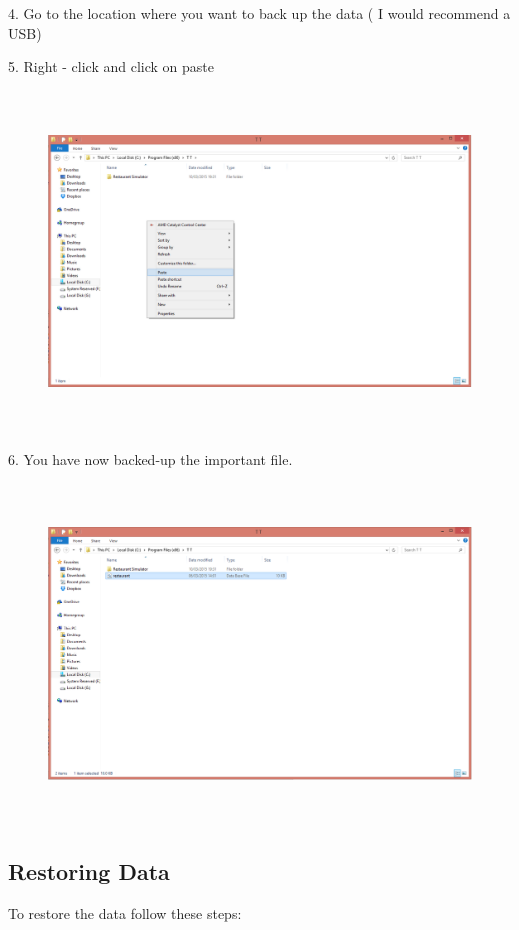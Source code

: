 4. Go to the location where you want to back up the data ( I would recommend a USB)

5. Right - click and click on paste

\begin{figure}[H]
    \includegraphics[height = 9cm]{./Manual/images/backup2} 
    \caption{} \label{fig:t}
\end{figure}

6. You have now backed-up the important file.
\begin{figure}[H]
    \includegraphics[height = 9cm]{./Manual/images/backup3} 
    \caption{} \label{fig:b}
\end{figure}

\subsection{Restoring Data}
To restore the data follow these steps:


